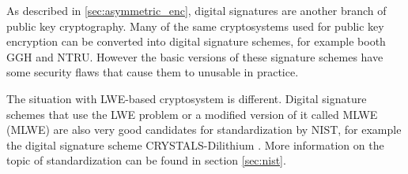 As described in \ref{sec:asymmetric_enc}, digital signatures are another branch of public key cryptography. Many of the same cryptosystems used for public key encryption can be converted into digital signature schemes, for example booth GGH and NTRU. However the basic versions of these signature schemes have some security flaws that cause them to unusable in practice. \cite{Bernstein2009}

The situation with LWE-based cryptosystem is different. Digital signature schemes that use the LWE problem or a modified version of it called MLWE (\acl{MLWE}) are also very good candidates for standardization by NIST, for example the digital signature scheme CRYSTALS-Dilithium \cite{Grimes2020}. More information on the topic of standardization can be found in section \ref{sec:nist}.